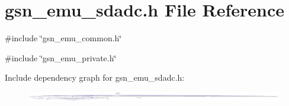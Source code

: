\hypertarget{a00492}{
\section{gsn\_\-emu\_\-sdadc.h File Reference}
\label{a00492}
}
{\ttfamily \#include \char`\"{}gsn\_\-emu\_\-common.h\char`\"{}}\par
{\ttfamily \#include \char`\"{}gsn\_\-emu\_\-private.h\char`\"{}}\par
Include dependency graph for gsn\_\-emu\_\-sdadc.h:
\nopagebreak
\begin{figure}[H]
\begin{center}
\leavevmode
\includegraphics[width=400pt]{a00723}
\end{center}
\end{figure}
